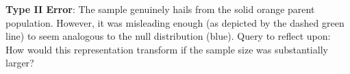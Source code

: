 \documentclass[
  letterpaper,
  DIV=11,
  numbers=noendperiod]{scrreprt}
\begin{document}
\begin{figure}


\caption{\label{fig-5-5.type_1_samplesize_larger}}

\end{figure}%

\textbf{Type II Error}: The sample genuinely hails from the solid orange
parent population. However, it was misleading enough (as depicted by the
dashed green line) to seem analogous to the null distribution (blue).
Query to reflect upon: How would this representation transform if the
sample size was substantially larger?

\begin{figure}


\caption{\label{fig-5-5.type_2_samplesize}}

\end{figure}%
\end{document}

